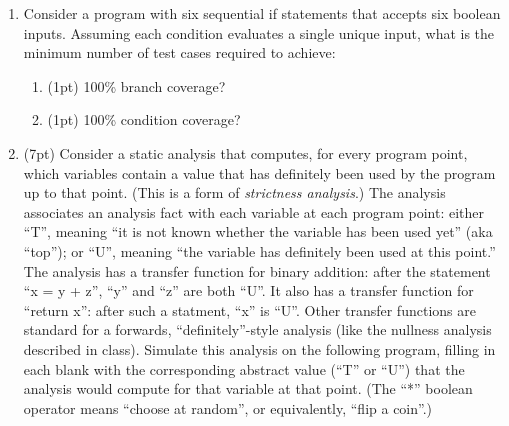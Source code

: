\documentclass{report}
\newif\ifkey
\newcommand{\answershort}[1]{\ifkey\color{red}\underline{\textbf{#1}}\color{black}\else\underline{\hspace{3in}}\fi\xspace}
\newcommand{\answerlong}[1]{\ifkey\color{red}\textbf{#1}\color{black}\else\vspace{0.5in}\fi\xspace}
\newcommand*{\pts}[1]{\addtocounter{points}{#1}(#1pt)}
\begin{document}
\begin{spacing}{1.4}
\begin{enumerate}[leftmargin=*]

\item Consider a program with six sequential if statements that accepts six boolean
inputs. Assuming each condition evaluates a single unique input, what is the minimum
number of test cases required to achieve:
\begin{enumerate}
\item \pts{1} 100\% branch coverage? \answershort{2: one all false, one all true}
\item \pts{1} 100\% condition coverage? \answershort{12 = 2*6}
\end{enumerate}
\newpage

\item \pts{7} Consider a static analysis that computes, for every program point, which variables contain a value that has
  definitely been used by the program up to that point. (This is a form of \emph{strictness analysis}.) The analysis
  associates an analysis fact with each variable at each program point: either ``T'', meaning ``it is not known whether the
  variable has been used yet'' (aka ``top''); or ``U'', meaning ``the variable has definitely been used at this point.'' The analysis has
  a transfer function for binary addition: after the statement ``x = y + z'', ``y'' and ``z'' are both ``U''. It also has a
  transfer function for ``return x'': after such a statment, ``x'' is ``U''. Other transfer functions are standard for a forwards,
  ``definitely''-style analysis (like the nullness analysis described in class).
  Simulate this analysis on the following program, filling in each blank with the corresponding abstract value (``T'' or ``U'')
  that the analysis would compute for that variable at that point. (The ``*'' boolean operator means ``choose at random'', or equivalently, ``flip a coin''.)


\end{enumerate}
\end{spacing}
\end{document}
